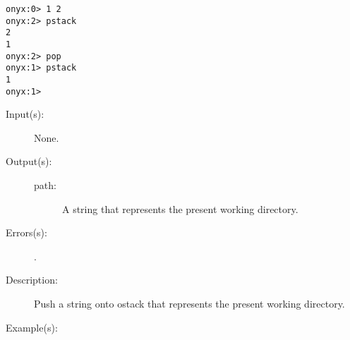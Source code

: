 \begin{description}
\begin{description}
\begin{verbatim}
onyx:0> 1 2
onyx:2> pstack
2
1
onyx:2> pop
onyx:1> pstack
1
onyx:1>
		\end{verbatim}
	\end{description}
\label{systemdict:pwd}
\item[{\onyxop{--}{pwd}{path}}: ]
	\begin{description}\item[]
	\item[Input(s): ] None.
	\item[Output(s): ]
		\begin{description}\item[]
		\item[path: ]
			A string that represents the present working directory.
		\end{description}
	\item[Errors(s): ]
		\begin{description}\item[]
		\item[.]
		\end{description}
	\item[Description: ]
		Push a string onto ostack that represents the present working
		directory.
	\item[Example(s): ]\begin{verbatim}


\end{verbatim}
\end{description}
\end{description}
